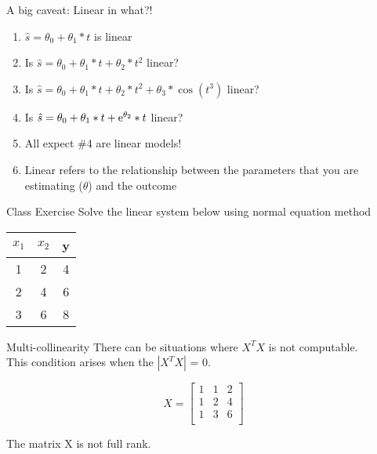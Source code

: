 \documentclass{beamer}
\begin{document}
\begin{frame}{A big caveat: Linear in what?!\footnotemark}
\begin{enumerate}[<+->]
	\item $\hat{s}=\theta_0 + \theta_1*t$
	 is linear
	 \item Is $\hat{s}=\theta_0 + \theta_1*t + \theta_2*t^2$
	 linear?
	 \item Is $\hat{s}=\theta_0 + \theta_1*t + \theta_2*t^2 + \theta_3*\cos(t^3)$
	 linear?
	\item Is $\hat{s}=\theta_0 + \theta_1*t + {\rm e}^{\theta_2}*t$
	linear?
	\item All expect \#4 are linear models! 
	\item Linear refers to the relationship between the parameters that you are estimating ($\theta$) and the outcome 
\end{enumerate}
\end{frame}


\begin{frame}{Class Exercise}
Solve the linear system below using normal equation method
\begin{center}
	\begin{tabular}{||c c | c||} 
		\hline
		$x_{1}$  & $x_{2}$ & y  \\ [0.5ex] 
		\hline\hline
		1 & 2 & 4 \\
		2 & 4 & 6\\
		3 & 6 & 8\\
		\hline
	\end{tabular}
\end{center}
\end{frame}
\begin{frame}{Multi-collinearity}
There can be situations where $X^{T}X$ is not computable. \\
\pause This condition arises when the $|X^{T}X|$ = 0.

\begin{equation}
X = \begin{bmatrix}
1 & 1& 2\\
1 & 2& 4\\
1 & 3& 6\\
\end{bmatrix}
\end{equation}

\pause The matrix X is not full rank. 
\end{frame}
\end{document}
